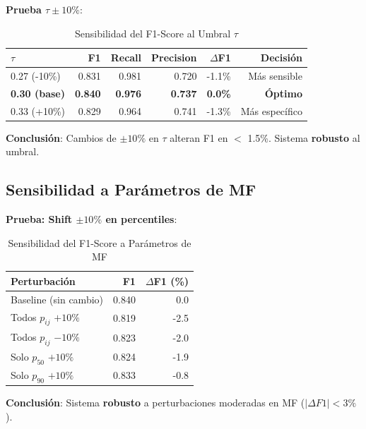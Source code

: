 \documentclass[12pt,letterpaper,twoside]{report}
\begin{document}
\begin{calculobox}
\textbf{Prueba $\tau \pm 10\%$}:

\begin{table}[H]
\centering
\caption{Sensibilidad del F1-Score al Umbral $\tau$}
\label{tab:tau_sensitivity}
\begin{tabular}{@{}lrrrrr@{}}
\toprule
\textbf{$\tau$} & \textbf{F1} & \textbf{Recall} & \textbf{Precision} & \textbf{$\Delta$F1} & \textbf{Decisión} \\
\midrule
0.27 (-10\%) & 0.831 & 0.981 & 0.720 & -1.1\% & Más sensible \\
\textbf{0.30 (base)} & \textbf{0.840} & \textbf{0.976} & \textbf{0.737} & \textbf{0.0\%} & \textbf{Óptimo} \\
0.33 (+10\%) & 0.829 & 0.964 & 0.741 & -1.3\% & Más específico \\
\bottomrule
\end{tabular}
\end{table}

\textbf{Conclusión}: Cambios de $\pm 10\%$ en $\tau$ alteran F1 en $<$ 1.5\%. Sistema \textbf{robusto} al umbral.
\end{calculobox}

\subsection{Sensibilidad a Parámetros de MF}

\begin{calculobox}
\textbf{Prueba: Shift $\pm 10\%$ en percentiles}:

\begin{table}[H]
\centering
\caption{Sensibilidad del F1-Score a Parámetros de MF}
\label{tab:mf_sensitivity}
\begin{tabular}{@{}lrr@{}}
\toprule
\textbf{Perturbación} & \textbf{F1} & \textbf{$\Delta$F1 (\%)} \\
\midrule
Baseline (sin cambio)   & 0.840 & 0.0 \\
Todos $p_{ij}$ $+10\%$  & 0.819 & -2.5 \\
Todos $p_{ij}$ $-10\%$  & 0.823 & -2.0 \\
Solo $p_{50}$ $+10\%$   & 0.824 & -1.9 \\
Solo $p_{90}$ $+10\%$   & 0.833 & -0.8 \\
\bottomrule
\end{tabular}
\end{table}

\textbf{Conclusión}: Sistema \textbf{robusto} a perturbaciones moderadas en MF ($|\Delta F1| < 3\%$).
\end{calculobox}
\end{document}
